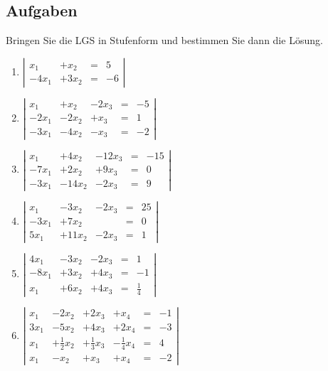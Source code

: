 \documentclass[12pt,a4paper,twoside,fleqn]{article}
\begin{document}
\subsection{Aufgaben}
\begin{question}%
 Bringen Sie die LGS in Stufenform und bestimmen Sie dann die
 Lösung.
  \begin{multicols}{2}
    \begin{enumerate}
     \item 
      $\left|
        \begin{array}{rlcl}
          x_1&+x_2&=& 5\\
          -4x_1&+3x_2&=&-6
        \end{array}\right|$ 
       \item 
      $\left|
        \begin{array}{rllcl}
          x_1&+x_2&-2x_3&=& -5\\
          -2x_1&-2x_2&+x_3&=& 1\\
          -3x_1&-4x_2&-x_3&=&-2
        \end{array}\right|$ 
    \item 
      $\left|
        \begin{array}{rllcl}
          x_1&+4x_2&-12x_3&=& -15\\
          -7x_1&+2x_2&+9x_3&=& 0\\
          -3x_1&-14x_2&-2x_3&=&9
        \end{array}\right|$ 
     \item 
      $\left|
        \begin{array}{rllcl}
          x_1&-3x_2&-2x_3&=& 25\\
          -3x_1&+7x_2&&=& 0\\
          5x_1&+11x_2&-2x_3&=&1
        \end{array}\right|$ 
     \item 
      $\left|
        \begin{array}{rllcl}
          4x_1&-3x_2&-2x_3&=& 1\\
          -8x_1&+3x_2&+4x_3&=&-1 \\
          x_1&+6x_2&+4x_3&=&\frac 1 4
        \end{array}\right|$ 
      \item 
      $\left|
        \begin{array}{rlllcl}
          x_1&-2x_2&+2x_3&+x_4&=& -1\\
          3x_1&-5x_2&+4x_3&+2x_4&=&-3 \\
          x_1&+\frac 1 2 x_2&+\frac 1 3 x_3&-\frac 1 4 x_4&=& 4\\
          x_1&-x_2&+x_3&+x_4&=&-2
        \end{array}\right|$ 
    \end{enumerate}
  \end{multicols}
\end{question}
\end{document}
